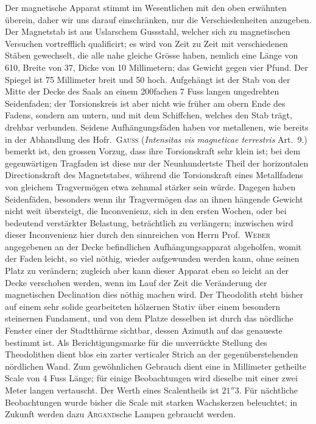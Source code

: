Der magnetische Apparat stimmt im Wesentlichen mit den oben erwähnten überein, daher wir uns darauf einschränken, nur die Verschiedenheiten anzugeben. Der Magnetstab ist aus Uslarschem Gussstahl, welcher sich zu magnetischen Versuchen vortrefflich qualificirt; es wird von Zeit zu Zeit mit verschiedenen Stäben gewechselt, die alle nahe gleiche Grösse haben, nemlich eine Länge von 610, Breite von 37, Dicke von 10 Millimetern; das Gewicht gegen vier Pfund. Der Spiegel ist 75 Millimeter breit und 50 hoch. Aufgehängt ist der Stab von der Mitte der Decke des Saals an einem 200fachen 7 Fuss langen ungedrehten Seidenfaden; der Torsionskreis ist aber nicht wie früher am obern Ende des Fadens, sondern am untern, und mit dem Schiffchen, welches den Stab trägt, drehbar verbunden. Seidene Aufhängungsfäden haben vor metallenen, wie bereits in der Abhandlung des Hofr.\ \textsc{Gauss} (\textit{Intensitas vis magneticae terrestris} Art.\ 9.) bemerkt ist, den grossen Vorzug, dass ihre Torsionskraft sehr klein ist; bei dem gegenwärtigen Tragfaden ist diese nur der Neunhundertste Theil der horizontalen Directionskraft des Magnetstabes, während die Torsionskraft eines Metallfadens von gleichem Tragvermögen etwa zehnmal stärker sein würde. Dagegen haben Seidenfäden, besonders wenn ihr Tragvermögen das an ihnen hängende Gewicht nicht weit übersteigt, die Inconvenienz, sich in den ersten Wochen, oder bei bedeutend verstärkter Belastung, beträchtlich zu verlängern; inzwischen wird dieser Inconvenienz hier durch den sinnreichen von Herrn Prof.\ \textsc{Weber} angegebenen an der Decke befindlichen Aufhängungsapparat abgeholfen, womit der Faden leicht, so viel nöthig, wieder aufgewunden werden kann, ohne seinen Platz zu verändern; zugleich aber kann dieser Apparat eben so leicht an der Decke verschoben werden, wenn im Lauf der Zeit die Veränderung der magnetischen Declination dies nöthig machen wird. Der Theodolith steht bisher auf einem sehr solide gearbeiteten hölzernen Stativ über einem besondern steinernen Fundament, und von dem Platze desselben ist durch das nördliche Fenster einer der Stadtthürme sichtbar, dessen Azimuth auf das genaueste bestimmt ist. Als Berichtigungsmarke für die unverrückte Stellung des Theodolithen dient blos ein zarter verticaler Strich an der gegenüberstehenden nördlichen Wand. Zum gewöhnlichen Gebrauch dient eine in Millimeter getheilte Scale von 4 Fuss Länge; für einige Beobachtungen wird dieselbe mit einer zwei Meter langen vertauscht. Der Werth eines Scalentheils ist $21''3$. Für nächtliche Beobachtungen wurde bisher die Scale mit starken Wachskerzen beleuchtet; in Zukunft werden dazu \textsc{Argand}sche Lampen gebraucht werden.

